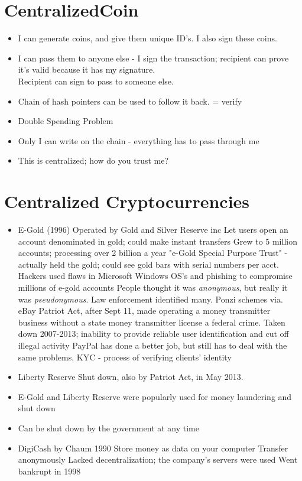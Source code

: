 \documentclass{article}
\begin{document}
\section*{CentralizedCoin}
\begin{itemize}
  \item I can generate coins, and give them unique ID's. I also sign these coins.
  \item I can pass them to anyone else - I sign the transaction; recipient can prove it's valid because it has my signature.\\
    Recipient can sign to pass to someone else. 
  \item Chain of hash pointers can be used to follow it back. = verify
  \item Double Spending Problem
  \item Only I can write on the chain - everything has to pass through me
  \item This is centralized; how do you trust me? 
\end{itemize}

\section*{Centralized Cryptocurrencies}
\begin{itemize}
  \item E-Gold (1996)
    \subitem Operated by Gold and Silver Reserve inc 
    \subitem Let users open an account denominated in gold; could make instant transfers
    \subitem Grew to 5 million accounts; processing over 2 billion a year
    \subitem "e-Gold Special Purpose Trust" - actually held the gold; could see gold bars with serial numbers per acct.
    \subitem Hackers used flaws in Microsoft Windows OS's and phishing to compromise millions of e-gold accounts
    \subitem People thought it was \emph{anonymous}, but really it was \emph{pseudonymous}. Law enforcement identified many.
    \subitem Ponzi schemes via. eBay 
    \subitem Patriot Act, after Sept 11, made operating a money transmitter business without a state money transmitter license a federal crime.
    \subitem Taken down 2007-2013; inability to provide reliable user identification and cut off illegal activity
    \subitem PayPal has done a better job, but still has to deal with the same problems.
    \subitem KYC - process of verifying clients' identity
  \item Liberty Reserve
    \subitem Shut down, also by Patriot Act, in May 2013. 
  \item E-Gold and Liberty Reserve were popularly used for money laundering and shut down
  \item Can be shut down by the government at any time
  \item DigiCash by Chaum 1990
    \subitem Store money as data on your computer
    \subitem Transfer anonymously
    \subitem Lacked decentralization; the company's servers were used
    \subitem Went bankrupt in 1998
\end{itemize}
\end{document}
